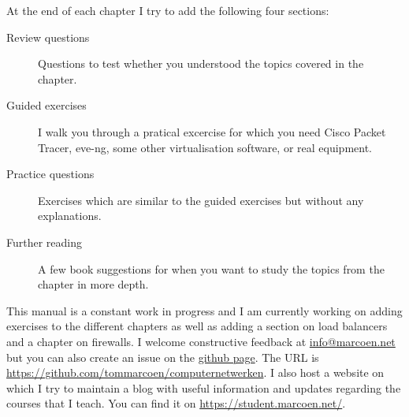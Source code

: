 At the end of each chapter I try to add the following four sections:
\begin{description}
\item[Review questions] Questions to test whether you understood the topics covered in the chapter.
\item[Guided exercises] I walk you through a pratical excercise for which you need Cisco Packet Tracer, eve-ng, some other virtualisation software, or real equipment.
\item[Practice questions] Exercises which are similar to the guided exercises but without any explanations.
\item[Further reading] A few book suggestions for when you want to study the topics from the chapter in more depth.
\end{description}

This manual is a constant work in progress and I am currently working on adding exercises to the different chapters as well as adding a section on load balancers and a chapter on firewalls.
I welcome constructive feedback at \href{mailto:info@marcoen.net}{info@\-marcoen.net} but you can also create an issue on the \href{https://github.com/tommarcoen/computernetwerken}{github page}.
The \acs{URL} is \url{https://github.com/tommarcoen/computernetwerken}.
I also host a website on which I try to maintain a blog with useful information and updates regarding the courses that I teach.
You can find it on \url{https://student.marcoen.net/}.



